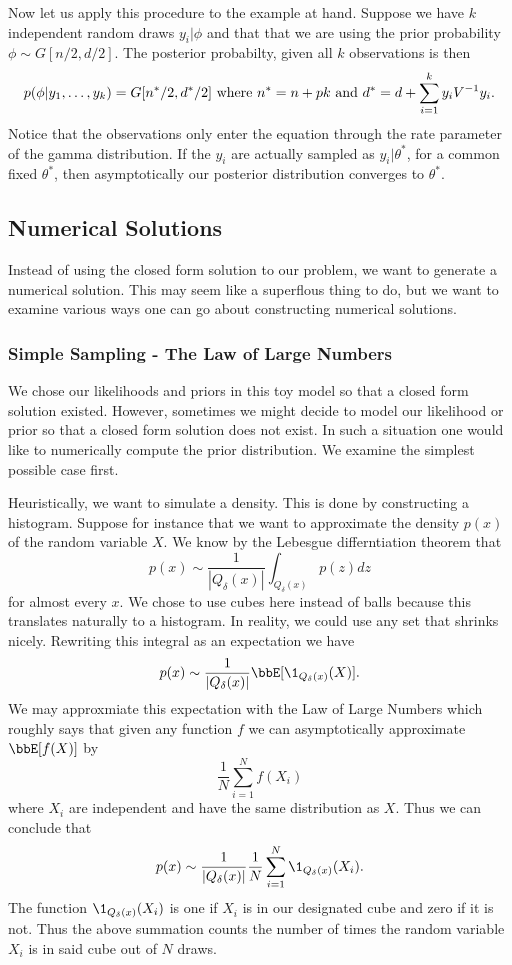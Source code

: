 \documentclass{report}
\begin{document}
Now let us apply this procedure to the example at hand.  Suppose we have $k$ independent random draws $y_i | \phi$ and that that we are using the prior probability $\phi \sim G[n/2, d/2]$.  The posterior probabilty, given all $k$ observations is then
\[
p(\phi | y_1, \ldots, y_k) = G[n^*/2, d^*/2] \textmd{ where } n^* = n+ pk \textmd{ and } d^* = d + \sum_{i=1}^k
  y_i V^{-1} y_i.
\]
Notice that the observations only enter the equation through the rate parameter of the gamma distribution.  If the $y_i$ are actually sampled as $y_i | \theta^*$, for a common fixed $\theta^*$, then asymptotically our posterior distribution converges to $\theta^*$.

\subsection{Numerical Solutions}

Instead of using the closed form solution to our problem, we want to generate a numerical solution.  This may seem like a superflous thing to do, but we want to examine various ways one can go about constructing numerical solutions.

\subsubsection{Simple Sampling - The Law of Large Numbers}

We chose our likelihoods and priors in this toy model so that a closed form solution existed.  However, sometimes we might decide to model our likelihood or prior so that a closed form solution does not exist.  In such a situation one would like to numerically compute the prior distribution.  We examine the simplest possible case first.

Heuristically, we want to simulate a density.  This is done by constructing a histogram.  Suppose for instance that we want to approximate the density $p(x)$ of the random variable $X$.  We know by the Lebesgue differntiation theorem that
\[
p(x) \sim \frac{1}{|Q_\delta(x)|} \int_{Q_\delta(x)} p(z) dz
\]
for almost every $x$.  We chose to use cubes here instead of balls because this translates naturally to a histogram.  In reality, we could use any set that shrinks nicely.  Rewriting this integral as an expectation we have
\[
p(x) \sim \frac{1}{|Q_\delta(x)|} \bbE[ \1_{Q_\delta(x)}(X) ].
\]
We may approxmiate this expectation with the Law of Large Numbers which roughly says that given any function $f$ we can asymptotically approximate $\bbE[f(X)]$ by
\[
\frac{1}{N} \sum_{i=1}^N f(X_i)
\]
where $X_i$ are independent and have the same distribution as $X$.  Thus we can conclude that
\[
p(x) \sim \frac{1}{|Q_\delta(x)|} \frac{1}{N} \sum_{i=1}^N \1_{Q_\delta(x)} (X_i).
\]
The function $\1_{Q_\delta(x)}(X_i)$ is one if $X_i$ is in our designated cube and zero if it is not.  Thus the above summation counts the number of times the random variable $X_i$ is in said cube out of $N$ draws.
\end{document}
